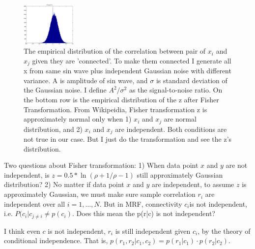 \documentclass[12pt]{article}
\begin{document}
\begin{figure}
\includegraphics[width = 0.24\textwidth]{figures/empriLL2z.eps} 
\caption{The empirical distribution of the correlation between pair of $x_i$ and $x_j$ given they are 'connected'. To make them connected I generate all x from same sin wave plus independent Gaussian noise with different variance. A is amplitude of sin wave, and $\sigma$ is standard deviation of the Gaussian noise. I define $A^2/\sigma^2$ as the signal-to-noise ratio. On the bottom row is the empirical distribution of the z after Fisher Transformation. From Wikipeidia, Fisher transformation z is approximately normal only when 1) $x_i$ and $x_j$ are normal distribution, and 2) $x_i$ and $x_j$ are independent. Both conditions are not true in our case. But I just do the transformation and see the z's distribution.}
\label{1D}
\end{figure}

Two questions about Fisher transformation: 1) When data point $x$ and $y$ are not independent, is $z = 0.5*\ln (\rho+1/\rho-1)$ still approximately Gaussian distribution? 2) No matter if data point $x$ and $y$ are independent, to assume $z$ is approximately Gaussian, we must make sure sample correlation $r_i$ are independent over all $i = 1,...,N$. But in MRF, connectivity $c_i$is not independent, i.e. $P(c_i|c_{j\neq i} \neq p(c_i)$. Does this mean the p(r|c) is not independent?

I think even $c$ is not independent, $r_i$ is still independent given $c_i$, by the theory of conditional independence. That is, $p(r_1, r_2| c_1, c_2) = p(r_1|c_1)\cdot p(r_2|c_2)$. 
\end{document}
